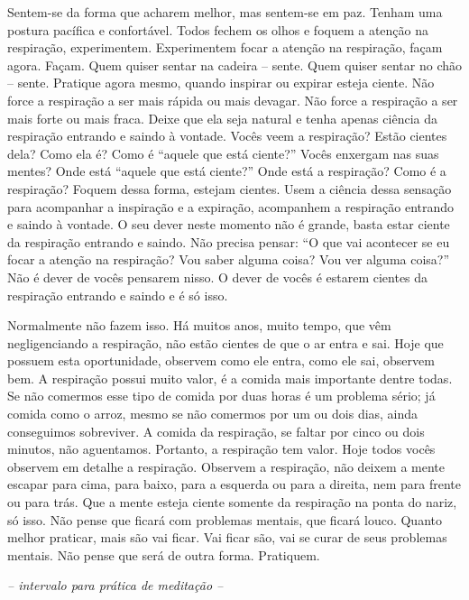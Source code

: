 Sentem-se da forma que acharem melhor, mas sentem-se em paz. Tenham
uma postura pacífica e confortável. Todos fechem os olhos e foquem a
atenção na respiração, experimentem. Experimentem focar a atenção na
respiração, façam agora. Façam. Quem quiser sentar na cadeira – sente.
Quem quiser sentar no chão – sente. Pratique agora mesmo, quando
inspirar ou expirar esteja ciente. Não force a respiração a ser mais
rápida ou mais devagar. Não force a respiração a ser mais forte ou mais
fraca. Deixe que ela seja natural e tenha apenas ciência da respiração
entrando e saindo à vontade. Vocês veem a respiração? Estão cientes
dela? Como ela é? Como é “aquele que está ciente?” Vocês enxergam nas
suas mentes? Onde está “aquele que está ciente?” Onde está a
respiração? Como é a respiração? Foquem dessa forma, estejam cientes.
Usem a ciência dessa sensação para acompanhar a inspiração e a
expiração, acompanhem a respiração entrando e saindo à vontade. O seu
dever neste momento não é grande, basta estar ciente da respiração
entrando e saindo. Não precisa pensar: “O que vai acontecer se eu focar
a atenção na respiração? Vou saber alguma coisa? Vou ver alguma coisa?”
Não é dever de vocês pensarem nisso. O dever de vocês é estarem cientes
da respiração entrando e saindo e é só isso.

Normalmente não fazem isso. Há muitos anos, muito tempo, que vêm
negligenciando a respiração, não estão cientes de que o ar entra e sai.
Hoje que possuem esta oportunidade, observem como ele entra, como ele
sai, observem bem. A respiração possui muito valor, é a comida mais
importante dentre todas. Se não comermos esse tipo de comida por duas
horas é um problema sério; já comida como o arroz, mesmo se não
comermos por um ou dois dias, ainda conseguimos sobreviver. A comida da
respiração, se faltar por cinco ou dois minutos, não aguentamos.
Portanto, a respiração tem valor. Hoje todos vocês observem em detalhe
a respiração. Observem a respiração, não deixem a mente escapar para
cima, para baixo, para a esquerda ou para a direita, nem para frente ou
para trás. Que a mente esteja ciente somente da respiração na ponta do
nariz, só isso. Não pense que ficará com problemas mentais, que ficará
louco. Quanto melhor praticar, mais são vai ficar. Vai ficar são, vai
se curar de seus problemas mentais. Não pense que será de outra forma.
Pratiquem.

\clearpage

{\centering\itshape
-- intervalo para prática de meditação --
\par}


